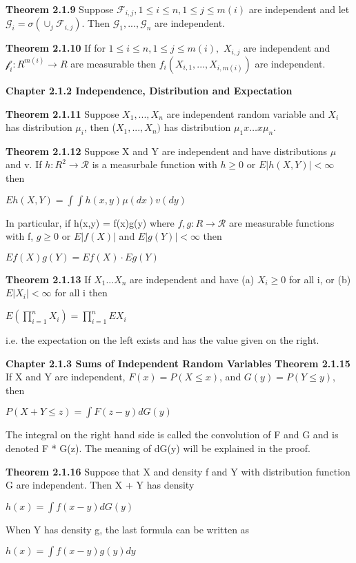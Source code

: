 \documentclass{article}
\begin{document}
\textbf {Theorem 2.1.9} Suppose $\mathcal{F}_{i,j}, 1 \leq i \leq n, 1 \leq j \leq m(i)$ are independent and let $\mathcal{G}_i = \sigma(\cup_j \mathcal{F}_{i,j}).$ Then $\mathcal{G}_1 ,..., \mathcal{G}_n$ are independent.

\textbf {Theorem 2.1.10} If for $1 \leq i \leq n, 1 \leq j \leq m(i),$  $X_{i,j}$ are independent and $\mathcal{f}_i : R^{m(i)} \rightarrow R$ are measurable then $f_i (X_{i,1},..., X_{i,m(i)})$ are independent.

\textbf {Chapter 2.1.2 Independence, Distribution and Expectation}

\textbf {Theorem 2.1.11} Suppose $X_1 ,..., X_n$ are independent random variable and $X_i$ has distribution $\mu_i$, then ($X_1 ,..., X_n)$ has distribution $\mu_1 x \dots x \mu_n$.

\textbf {Theorem 2.1.12} Suppose X and Y are independent and have distributions $\mu$ and v. If $h: R^2 \rightarrow \mathcal{R}$ is a measurbale function with $h \geq 0$ or $E|h(X,Y)| < \infty$ then
\begin{center}
$Eh(X,Y) = \int \int h(x,y) \mu(dx) v(dy)$
\end{center}
In particular, if h(x,y) = f(x)g(y) where $f, g: R \rightarrow \mathcal{R}$ are measurable functions with f, $g \geq 0$ or $E|f(X)|$ and $E|g(Y)| < \infty$ then
\begin{center}
$Ef(X)g(Y) = Ef(X) \cdot Eg(Y)$
\end{center}

\textbf {Theorem 2.1.13} If $X_1 ... X_n$ are independent and have (a) $X_i \geq 0$ for all i, or (b) $E|X_i| < \infty$ for all i then
\begin{center}
$E(\prod_{i=1}^n X_i ) = \prod_{i=1}^n EX_i$
\end{center}
i.e. the expectation on the left exists and has the value given on the right.

\textbf {Chapter 2.1.3 Sums of Independent Random Variables} 
\textbf {Theorem 2.1.15} If X and Y are independent, $F(x) = P(X \leq x)$, and $G(y) = P(Y \leq y)$, then
\begin{center}
$P(X + Y \leq z) = \int F(z-y) dG(y)$
\end{center}
The integral on the right hand side is called the convolution of F and G and is denoted F * G(z). The meaning of dG(y) will be explained in the proof.

\textbf {Theorem 2.1.16} Suppose that X and density f and Y with distribution function G are independent. Then X + Y has density
\begin{center}
$h(x) = \int f(x-y) dG(y)$
\end{center}
When Y has density g, the last formula can be written as
\begin{center}
$h(x) = \int f(x-y) g(y) dy$
\end{center}
\end{document}
